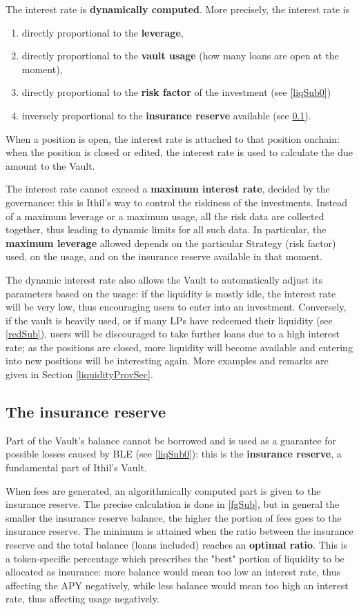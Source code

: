 \documentclass[a4paper,10 pt]{article}
\theoremstyle{definition}
\begin{document}
The interest rate is {\bf dynamically computed}. More precisely, the interest rate is
\begin{enumerate} 
\item directly proportional to the {\bf leverage}, 
\item directly proportional to the {\bf vault usage} (how many loans are open at the moment), 
\item directly proportional to the {\bf risk factor} of the investment (see \ref{liqSub0}) 
\item inversely proportional to the {\bf insurance reserve} available (see \ref{insResSub}).
\end{enumerate}
When a position is open, the interest rate is attached to that position onchain: when the position is closed or edited, the interest rate is used to calculate the due amount to the Vault.

The interest rate cannot exceed a {\bf maximum interest rate}, decided by the governance: this is Ithil's way to control the riskiness of the investments. Instead of a maximum leverage or a maximum usage, all the risk data are collected together, thus leading to dynamic limits for all such data. In particular, the {\bf maximum leverage} allowed depends on the particular Strategy (risk factor) used, on the usage, and on the insurance reserve available in that moment. 

The dynamic interest rate also allows the Vault to automatically adjust its parameters based on the usage: if the liquidity is mostly idle, the interest rate will be very low, thus encouraging users to enter into an investment. Conversely, if the vault is heavily used, or if many LPs have redeemed their liquidity (see \ref{redSub}), users will be discouraged to take further loans due to a high interest rate; as the positions are closed, more liquidity will become available and entering into new positions will be interesting again. More examples and remarks are given in Section \ref{liquidityProvSec}.

\subsection{The insurance reserve}\label{insResSub}

Part of the Vault's balance cannot be borrowed and is used as a guarantee for possible losses caused by BLE (see \ref{liqSub0}): this is the {\bf insurance reserve}, a fundamental part of Ithil's Vault.

When fees are generated, an algorithmically computed part is given to the insurance reserve. The precise calculation is done in \ref{fgSub}, but in general the smaller the insurance reserve balance, the higher the portion of fees goes to the insurance reserve. The minimum is attained when the ratio between the insurance reserve and the total balance (loans included) reaches an {\bf optimal ratio}. This is a token-specific percentage which prescribes the "best" portion of liquidity to be allocated as insurance: more balance would mean too low an interest rate, thus affecting the APY negatively, while less balance would mean too high an interest rate, thus affecting usage negatively.
\end{document}
